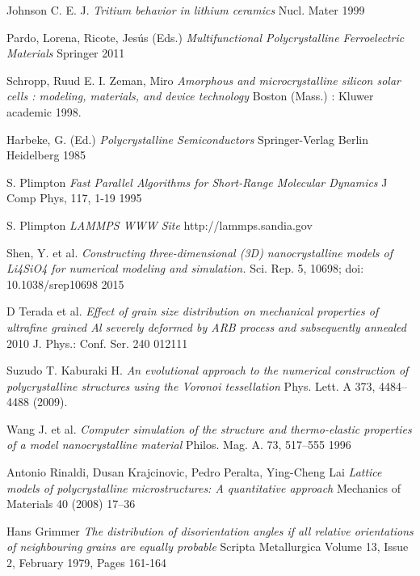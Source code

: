 \documentclass[12pt]{report}
\begin{document}
\begin{thebibliography}{9}

  Johnson C. E. J.
  \textit{Tritium behavior in lithium ceramics}
  Nucl. Mater
  1999

  Pardo, Lorena, Ricote, Jesús (Eds.)
  \textit{Multifunctional Polycrystalline Ferroelectric Materials}
  Springer
  2011

  Schropp, Ruud E. I. Zeman, Miro
  \textit{Amorphous and microcrystalline silicon solar cells : modeling, materials, and device technology}
  Boston (Mass.) : Kluwer academic
  1998.

   Harbeke, G. (Ed.)
  \textit{Polycrystalline Semiconductors}
  Springer-Verlag Berlin Heidelberg
  1985

   S. Plimpton 
  \textit{Fast Parallel Algorithms for Short-Range Molecular Dynamics}
  J Comp Phys, 117, 1-19
  1995

   S. Plimpton 
  \textit{LAMMPS WWW Site}
  http://lammps.sandia.gov

  Shen, Y. et al. 
  \textit{Constructing three-dimensional (3D) nanocrystalline models of Li4SiO4 for numerical modeling and simulation.}
  Sci. Rep. 5, 10698; doi: 10.1038/srep10698 
  2015

  D Terada et al.
  \textit{Effect of grain size distribution on mechanical properties of ultrafine grained Al severely deformed by ARB process and subsequently annealed}
  2010 J. Phys.: Conf. Ser. 240 012111


  Suzudo T.  Kaburaki H. 
  \textit{An evolutional approach to the numerical construction of polycrystalline structures using the Voronoi tessellation}
  Phys. Lett. A 373, 4484–4488 (2009).

  Wang J. et al. 
  \textit{Computer simulation of the structure and thermo-elastic properties of a model nanocrystalline material}
  Philos. Mag. A. 73, 517–555 
  1996

  Antonio Rinaldi, Dusan Krajcinovic, Pedro Peralta, Ying-Cheng Lai
  \textit{Lattice models of polycrystalline microstructures: A quantitative approach}
  Mechanics of Materials 40 (2008) 17–36

  Hans Grimmer
  \textit{The distribution of disorientation angles if all relative orientations of neighbouring grains are equally probable}
  Scripta Metallurgica
Volume 13, Issue 2, February 1979, Pages 161-164


\end{thebibliography}
\end{document}
